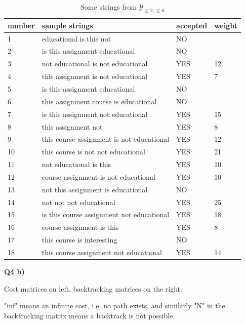 \documentclass{article}
\begin{document}
	\begin{table}[ht]
        \centering
        \fontsize{10}{10}\selectfont
        \renewcommand{\arraystretch}{1.2} %
        \setlength{\tabcolsep}{0.5em} %
        \begin{tabular}{l|l|l|l}
        \textbf{number} & \textbf{sample strings} & \textbf{accepted} & \textbf{weight} \\ \hline
        1 & educational is this not & NO &  \\
        2 & is this assignment educational & NO & \\
        3 & not educational is not educational  & YES & 12 \\
        4 & this assignment is not educational & YES & 7 \\
        5 & is this assignment educational & NO &  \\
        6 & this assignment course is educational & NO  &  \\
        7 & is this assignment not educational &  YES & 15 \\
        8 & this assignment not & YES & 8 \\
        9 & this course assignment is not educational & YES  & 12 \\
        10 & this course is not not educational & YES & 21 \\
        11 & not educational is this & YES & 10 \\
        12 & course assignment is not educational & YES & 10 \\
        13 & not this assignment is educational & NO &  \\
        14 & not not not educational & YES & 25 \\
        15 & is this course assignment not educational  & YES & 18 \\
        16 & course assignment is this & YES & 8 \\
        17 & this course is interesting & NO &  \\
        18 & this course assignment not educational & YES & 14
        \end{tabular}
        \caption{Some strings from $\mathcal{Y}_{\geq 2, \leq 6}$}
        \label{tab:wfst_strings}
        \end{table}
	
	
\textbf{Q4 b)}

	Cost matrices on left, backtracking matrices on the right.
	
	"inf" means an infinite cost, i.e. no path exists, and similarly "N" in the backtracking matrix means a backtrack is not possible.
	
\end{document}
